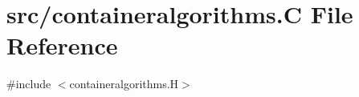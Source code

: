 \hypertarget{containeralgorithms_8_c}{}\section{src/containeralgorithms.C File Reference}
\label{containeralgorithms_8_c}
{\ttfamily \#include $<$containeralgorithms.\+H$>$}\newline
